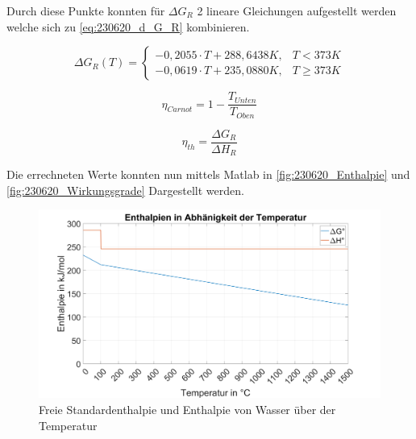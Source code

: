Durch diese Punkte konnten für $\Delta G_R$ 2 lineare Gleichungen aufgestellt werden welche sich zu \autoref{eq:230620_d_G_R} kombinieren.

\begin{equation}
    \Delta G_R(T) =
    \begin{cases}
        -0,2055 \cdot T + 288,6438 K, & T < 373 K \\
        -0,0619 \cdot T + 235,0880 K, & T \geq 373 K
    \end{cases}
    \label{eq:230620_d_G_R}
\end{equation}

\begin{equation}
    \eta_{Carnot} = 1 - \frac{T_{Unten}}{T_{Oben}}
    \label{eq:230620_Carnot}
\end{equation}

\begin{equation}
    \eta_{th} = \frac{\Delta G_R}{\Delta H_R}
    \label{eq:230620_Gibbs-Helmholtz}
\end{equation}

Die errechneten Werte konnten nun mittels Matlab in \autoref{fig:230620_Enthalpie} und \autoref{fig:230620_Wirkungsgrade} Dargestellt werden.

\begin{figure}[H]
    \centering
    \includegraphics[width=\textwidth]{Abbildungen/Enthalpien.png}
    \caption{Freie Standardenthalpie und Enthalpie von Wasser über der Temperatur}
    \label{fig:230620_Enthalpie}
\end{figure}

